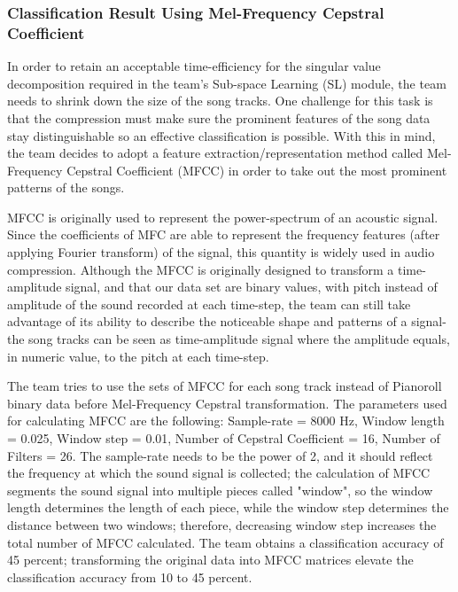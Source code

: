\begin{par}
    \subsubsection{Classification Result Using Mel-Frequency Cepstral Coefficient}
    \par \hspace{15pt} In order to retain an acceptable time-efficiency for the singular value decomposition required in the team's Sub-space Learning (SL) module, the team needs to shrink down the size of the song tracks. One challenge for this task is that the compression must make sure the prominent features of the song data stay distinguishable so an effective classification is possible. With this in mind, the team decides to adopt a feature extraction/representation method called Mel-Frequency Cepstral Coefficient (MFCC) in order to take out the most prominent patterns of the songs.
    \par MFCC is originally used to represent the power-spectrum of an acoustic signal. Since the coefficients of MFC are able to represent the frequency features (after applying Fourier transform) of the signal, this quantity is widely used in audio compression. Although the MFCC is originally designed to transform a time-amplitude signal, and that our data set are binary values, with pitch instead of amplitude of the sound recorded at each time-step, the team can still take advantage of its ability to describe the noticeable shape and patterns of a signal-the song tracks can be seen as time-amplitude signal where the amplitude equals, in numeric value, to the pitch at each time-step.
    \par The team tries to use the sets of MFCC for each song track instead of Pianoroll binary data before Mel-Frequency Cepstral transformation. The parameters used for calculating MFCC are the following: Sample-rate = 8000 Hz, Window length = 0.025, Window step = 0.01, Number of Cepstral Coefficient = 16, Number of Filters = 26. The sample-rate needs to be the power of 2, and it should reflect the frequency at which the sound signal is collected; the calculation of MFCC segments the sound signal into multiple pieces called "window", so the window length determines the length of each piece, while the window step determines the distance between two windows; therefore, decreasing window step increases the total number of MFCC calculated. The team obtains a classification accuracy of 45 percent; transforming the original data into MFCC matrices elevate the classification accuracy from 10 to 45 percent.

\end{par}